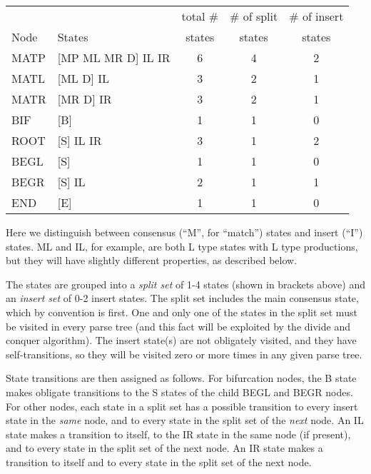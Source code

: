 \documentclass[11pt]{article}
\begin{document}
\vspace{0.5em}
\begin{tabular}{llccc}
       &                     & total \#& \# of split& \# of insert\\
Node   &  States             & states  & states     & states \\ \hline
MATP   & [MP ML MR D] IL IR  &   6     &   4        &  2   \\
MATL   & [ML D] IL           &   3     &   2    &  1   \\
MATR   & [MR D] IR           &   3     &   2    &  1   \\
BIF    & [B]                 &   1     &   1    &  0   \\
ROOT   & [S] IL IR           &   3     &   1    &  2   \\
BEGL   & [S]                 &   1     &   1    &  0   \\
BEGR   & [S] IL              &   2     &   1    &  1   \\
END    & [E]                 &   1     &   1    &  0   \\ \hline
\end{tabular}
\vspace{0.5em}

Here we distinguish between consensus (``M'', for ``match'') states
and insert (``I'') states. ML and IL, for example, are both L type
states with L type productions, but they will have slightly different
properties, as described below.

The states are grouped into a \emph{split set} of 1-4 states (shown in
brackets above) and an \emph{insert set} of 0-2 insert states. The
split set includes the main consensus state, which by convention is
first. One and only one of the states in the split set must be visited
in every parse tree (and this fact will be exploited by the divide and
conquer algorithm). The insert state(s) are not obligately visited,
and they have self-transitions, so they will be visited zero or more
times in any given parse tree.

State transitions are then assigned as follows. For bifurcation nodes,
the B state makes obligate transitions to the S states of the child
BEGL and BEGR nodes. For other nodes, each state in a split set has a
possible transition to every insert state in the \emph{same} node, and
to every state in the split set of the \emph{next} node. An IL state
makes a transition to itself, to the IR state in the same node (if
present), and to every state in the split set of the next node. An IR
state makes a transition to itself and to every state in the split set
of the next node.
\end{document}
